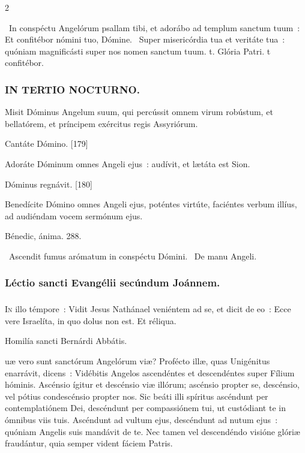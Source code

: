 \documentclass[9pt,twoside]{extarticle}
\begin{document}
\begin{multicols}{2}
{{{\begin{tightlist}{}
\item {}~In conspéctu Angelórum psallam tibi, et adorábo ad templum sanctum tuum~: \textred{*} Et confitébor nómini tuo, Dómine. ~Super misericórdia tua et veritáte tua~: quóniam magnificásti super nos nomen sanctum tuum. t. Glória Patri. t confitébor.
\end{tightlist}

\subsubsection*{\center \textsc{IN TERTIO NOCTURNO.}}
\begin{tightlist}{}
\item {} Misit Dóminus Angelum suum, qui percússit omnem virum robústum, et bellatórem, et príncipem exércitus regis Assyriórum.
\item {} Cantáte Dómino. [179]
\item {} Adoráte Dóminum omnes Angeli ejus~: audívit, et lætáta est Sion.
\item {} Dóminus regnávit. [180]
\item {} Benedícite Dómino omnes Angeli ejus, poténtes virtúte, faciéntes verbum illíus, ad audiéndam vocem sermónum ejus.
\item {} Bénedic, ánima. 288.
\item {}~Ascendit fumus arómatum in conspéctu Dómini. ~De manu Angeli.
\end{tightlist}

\subsubsection*{\center Léctio sancti Evangélii secúndum Joánnem.}
\subsubsection*{\center {}}
\lettrine{I}n illo témpore~: Vidit Jesus Nathánael veniéntem ad se, et dicit de eo~: Ecce vere Israelíta, in quo dolus non est. Et réliqua.

\begin{center}Homilía sancti Bernárdi Abbátis.\\
\end{center}
uæ vero sunt sanctórum Angelórum viæ? Profécto illæ, quas Unigénitus enarrávit, dicens~: Vidébitis Angelos ascendéntes et descendéntes super Fílium hóminis. Ascénsio ígitur et descénsio viæ illórum; ascénsio propter se, descénsio, vel pótius condescénsio propter nos. Sic beáti illi spíritus ascéndunt per contemplatiónem Dei, descéndunt per compassiónem tui, ut custódiant te in ómnibus viis tuis. Ascéndunt ad vultum ejus, descéndunt ad nutum ejus~: quóniam Angelis suis mandávit de te. Nec tamen vel descendéndo visióne glóriæ fraudántur, quia semper vident fáciem Patris.

}}}
\end{multicols}
\end{document}
